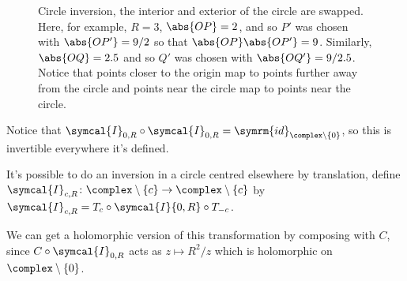 \documentclass[fleqn]{NotesClass}
\newcommand{\inversion}{\symcal{I}}
\newcommand{\id}{\symrm{id}}
\begin{document}
    \begin{figure}
        \caption[Circle inversion]{Circle inversion, the interior and exterior of the circle are swapped. Here, for example, \(R = 3\), \(\abs{OP} = 2\), and so \(P'\) was chosen with \(\abs{OP'} = 9/2\) so that \(\abs{OP}\abs{OP'} = 9\). Similarly, \(\abs{OQ} = 2.5\) and so \(Q'\) was chosen with \(\abs{OQ'} = 9/2.5\). Notice that points closer to the origin map to points further away from the circle and points near the circle map to points near the circle.}
        \label{fig:circle inversion}
    \end{figure}
    
    Notice that \(\inversion_{0,R} \circ \inversion_{0,R} = \id_{\complex\setminus\{0\}}\), so this is invertible everywhere it's defined.
    
    It's possible to do an inversion in a circle centred elsewhere by translation, define \(\inversion_{c, R} \colon \complex \setminus \{c\} \to \complex \setminus \{c\}\) by \(\inversion_{c, R} = T_c \circ \inversion{0, R} \circ T_{-c}\).
    
    We can get a holomorphic version of this transformation by composing with \(C\), since \(C \circ \inversion_{0, R}\) acts as \(z \mapsto R^2 / z\) which is holomorphic on \(\complex \setminus \{0\}\).
    
\end{document}

